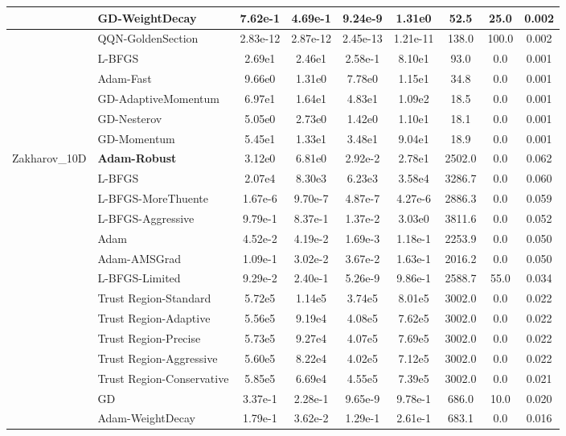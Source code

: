 \documentclass{article}
\begin{document}
\begin{longtable}{|l|l|c|c|c|c|c|c|c|}
\hline
 & GD-WeightDecay & 7.62e-1 & 4.69e-1 & 9.24e-9 & 1.31e0 & 52.5 & 25.0 & 0.002 \\
\hline
 & QQN-GoldenSection & 2.83e-12 & 2.87e-12 & 2.45e-13 & 1.21e-11 & 138.0 & 100.0 & 0.002 \\
\hline
 & L-BFGS & 2.69e1 & 2.46e1 & 2.58e-1 & 8.10e1 & 93.0 & 0.0 & 0.001 \\
\hline
 & Adam-Fast & 9.66e0 & 1.31e0 & 7.78e0 & 1.15e1 & 34.8 & 0.0 & 0.001 \\
\hline
 & GD-AdaptiveMomentum & 6.97e1 & 1.64e1 & 4.83e1 & 1.09e2 & 18.5 & 0.0 & 0.001 \\
\hline
 & GD-Nesterov & 5.05e0 & 2.73e0 & 1.42e0 & 1.10e1 & 18.1 & 0.0 & 0.001 \\
\hline
 & GD-Momentum & 5.45e1 & 1.33e1 & 3.48e1 & 9.04e1 & 18.9 & 0.0 & 0.001 \\
Zakharov\_10D & \textbf{Adam-Robust} & 3.12e0 & 6.81e0 & 2.92e-2 & 2.78e1 & 2502.0 & 0.0 & 0.062 \\
\hline
 & L-BFGS & 2.07e4 & 8.30e3 & 6.23e3 & 3.58e4 & 3286.7 & 0.0 & 0.060 \\
\hline
 & L-BFGS-MoreThuente & 1.67e-6 & 9.70e-7 & 4.87e-7 & 4.27e-6 & 2886.3 & 0.0 & 0.059 \\
\hline
 & L-BFGS-Aggressive & 9.79e-1 & 8.37e-1 & 1.37e-2 & 3.03e0 & 3811.6 & 0.0 & 0.052 \\
\hline
 & Adam & 4.52e-2 & 4.19e-2 & 1.69e-3 & 1.18e-1 & 2253.9 & 0.0 & 0.050 \\
\hline
 & Adam-AMSGrad & 1.09e-1 & 3.02e-2 & 3.67e-2 & 1.63e-1 & 2016.2 & 0.0 & 0.050 \\
\hline
 & L-BFGS-Limited & 9.29e-2 & 2.40e-1 & 5.26e-9 & 9.86e-1 & 2588.7 & 55.0 & 0.034 \\
\hline
 & Trust Region-Standard & 5.72e5 & 1.14e5 & 3.74e5 & 8.01e5 & 3002.0 & 0.0 & 0.022 \\
\hline
 & Trust Region-Adaptive & 5.56e5 & 9.19e4 & 4.08e5 & 7.62e5 & 3002.0 & 0.0 & 0.022 \\
\hline
 & Trust Region-Precise & 5.73e5 & 9.27e4 & 4.07e5 & 7.69e5 & 3002.0 & 0.0 & 0.022 \\
\hline
 & Trust Region-Aggressive & 5.60e5 & 8.22e4 & 4.02e5 & 7.12e5 & 3002.0 & 0.0 & 0.022 \\
\hline
 & Trust Region-Conservative & 5.85e5 & 6.69e4 & 4.55e5 & 7.39e5 & 3002.0 & 0.0 & 0.021 \\
\hline
 & GD & 3.37e-1 & 2.28e-1 & 9.65e-9 & 9.78e-1 & 686.0 & 10.0 & 0.020 \\
\hline
 & Adam-WeightDecay & 1.79e-1 & 3.62e-2 & 1.29e-1 & 2.61e-1 & 683.1 & 0.0 & 0.016 \\

\end{longtable}
\end{document}
